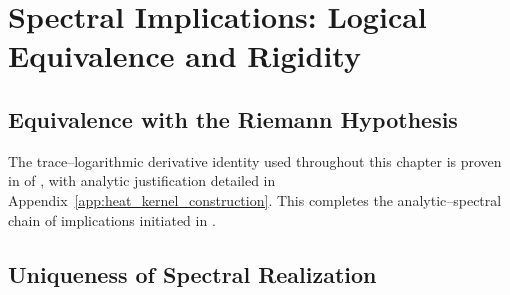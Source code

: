 \section{Spectral Implications: Logical Equivalence and Rigidity}
\label{sec:spectral_implications}



\subsection{Equivalence with the Riemann Hypothesis}
\label{sec:rh_equivalence}















\medskip
\noindent
The trace–logarithmic derivative identity used throughout this chapter is proven in  of , with analytic justification detailed in Appendix~\ref{app:heat_kernel_construction}. This completes the analytic–spectral chain of implications initiated in .

\subsection{Uniqueness of Spectral Realization}
\label{sec:uniqueness_spectral_realization}







